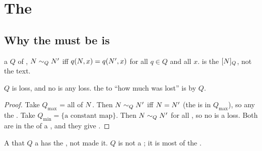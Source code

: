 \section{The }
\label{sec:est}

\subsection{Why the   must be    is }

\begin{definition}
 a  $Q$ of , $N \sim_Q N'$ iff
$q(N,x) = q(N',x)$ for all $q \in Q$ and all  $x$. \emph{
} is the   $[N]_Q$, not the text.
\end{definition}

\begin{proposition}
\label{prop:Q}
   $Q$     is  loss, and 
  no  is any loss.  the  to ``how much was lost'' is
  by $Q$.
\end{proposition}
\begin{proof}
Take $Q_{\max}$ = all   of $N$. Then $N\sim_{Q}N'$ iff
$N=N'$ (the   is in $Q_{\max}$), so any   the
 . Take $Q_{\min} = \{\text{a constant map}\}$. Then
$N \sim_Q N'$ for all , so no  is a loss. Both  are
 in the  of a , and they give  .
\end{proof}

\begin{corollary}
A  that  $Q$  a  has \emph{} the , not
made it.  $Q$   is not a ; it is most of the
.
\end{corollary}

